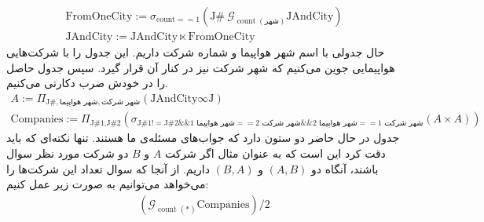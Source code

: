 \begin{enumerate}
\begin{gather*}
        \text{FromOneCity} := \sigma_{\text{count} == 1} (\text{J\#} ~ \mathcal{G}_{\operatorname{count}(\text{شهر})} \text{JAndCity})\\
        \text{JAndCity} := \text{JAndCity} \ltimes \text{FromOneCity}
    \end{gather*}
    حال جدولی با اسم شهر هواپیما و شماره شرکت داریم. این جدول را با شرکت‌هایی هواپیمایی جوین می‌کنیم که شهر
    شرکت نیز در کنار آن قرار گیرد. سپس جدول حاصل را در خودش ضرب دکارتی می‌کنیم.
    \begin{gather*}
        A := \Pi_{\text{J\#}, \text{شهر هواپیما}, \text{شهر شرکت}} (\text{JAndCity} \infty \text{J})\\
        \text{Companies} := \Pi_{\text{J\#1}, \text{J\#2}} (\sigma_{\text{J\#1} != \text{J\#2} \&\& \text{شهر هواپیما 1} == \text{شهر شرکت 2} \&\& \text{شهر هواپیما 2} == \text{شهر شرکت 1}} (A \times A))
    \end{gather*}
    جدول
    در حال حاضر دو ستون دارد که جواب‌های مسئله‌ی ما هستند. تنها نکته‌ای که باید دقت کرد این است که به عنوان مثال
    اگر شرکت
    $A$ و $B$
    دو شرکت مورد نظر سوال باشند، آنگاه دو
    $(A, B)$ و $(B, A)$
    داریم. از آنجا که سوال تعداد این شرکت‌ها را می‌خواهد می‌توانیم به صورت زیر عمل کنیم:
    \begin{gather*}
        (\mathcal{G}_{\operatorname{count}(*)}\text{Companies}) / 2
    \end{gather*}
\end{enumerate}